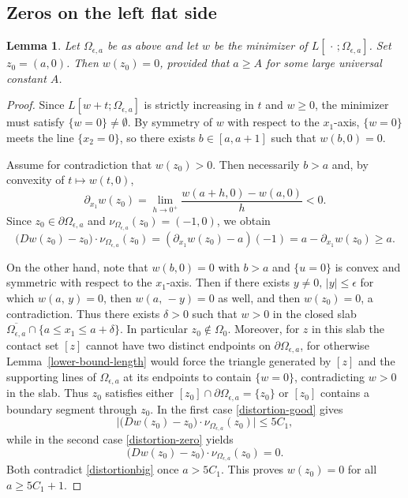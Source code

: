 \documentclass[reqno,11pt]{amsart}
\makeatletter
\def\ez{\epsilon}
\newtheorem{lem}[thm]{Lemma}%
\numberwithin{equation}{section}
\theoremstyle{remark}
\makeatother
\begin{document}
\subsection{Zeros on the left flat side}

\begin{lem}\label{left0}
Let $\Omega_{\epsilon,a}$ be as above and let $w$ be the minimizer of
$L[\,\cdot\,;\Omega_{\epsilon,a}]$. Set $z_0=(a,0)$. Then $w(z_0)=0$, provided that
$a\ge A$ for some large universal constant $A$.
\end{lem}

\begin{proof}
Since $L[w+t;\Omega_{\epsilon,a}]$ is strictly increasing in $t$ and $w\ge0$, the minimizer must satisfy
$\{w=0\}\neq\emptyset$.
By symmetry of $w$ with respect to the $x_1$-axis, $\{w=0\}$ meets the line $\{x_2=0\}$, so there exists
$b\in[a,a+1]$ such that $w(b,0)=0$.

Assume for contradiction that $w(z_0)>0$. Then necessarily $b>a$ and, by convexity of $t\mapsto w(t,0)$,
\[
\partial_{x_1}w(z_0)=\lim_{h\to0^+}\frac{w(a+h,0)-w(a,0)}{h}<0.
\]
Since $z_0\in\partial\Omega_{\epsilon,a}$ and $\nu_{\Omega_{\epsilon,a}}(z_0)=(-1,0)$, we obtain
\begin{equation}\label{distortionbig}
\bigl(Dw(z_0)-z_0\bigr)\cdot \nu_{\Omega_{\epsilon,a}}(z_0)
=(\partial_{x_1}w(z_0)-a)(-1)
=a-\partial_{x_1}w(z_0)\ge a.
\end{equation}

On the other hand, note that $w(b,0)=0$ with $b>a$ and $\{u=0\}$ is convex and symmetric with respect to the $x_1$-axis.
Then if there exists $y\neq0,\, |y|\le\ez$ for which $w(a,\,y)=0$, then $w(a,\,-y)=0$ as well, and then $w(z_0)=0$, a contradiction. Thus there exists $\delta>0$ such that $w>0$ in the closed slab
$\overline{\Omega_{\epsilon,a}}\cap\{a\le x_1\le a+\delta\}$.
In particular $z_0\notin\Omega_{0}$.
Moreover, for $z$ in this slab the contact set $[z]$ cannot have two distinct endpoints on
$\partial\Omega_{\epsilon,a}$, for otherwise Lemma~\ref{lower-bound-length} would force the triangle generated by $[z]$
and the supporting lines of $\Omega_{\epsilon,a}$ at its endpoints to contain $\{w=0\}$, contradicting $w>0$ in the slab.
Thus $z_0$ satisfies either $[z_0]\cap\partial\Omega_{\epsilon,a}=\{z_0\}$ or $[z_0]$ contains a boundary segment through $z_0$.
In the first case \eqref{distortion-good} gives
\[
\bigl|\bigl(Dw(z_0)-z_0\bigr)\cdot\nu_{\Omega_{\epsilon,a}}(z_0)\bigr|\le 5C_1,
\]
while in the second case \eqref{distortion-zero} yields
\[
\bigl(Dw(z_0)-z_0\bigr)\cdot\nu_{\Omega_{\epsilon,a}}(z_0)=0.
\]
Both contradict \eqref{distortionbig} once $a>5C_1$.
This proves $w(z_0)=0$ for all $a\ge 5C_1+1$.
\end{proof}
\end{document}
